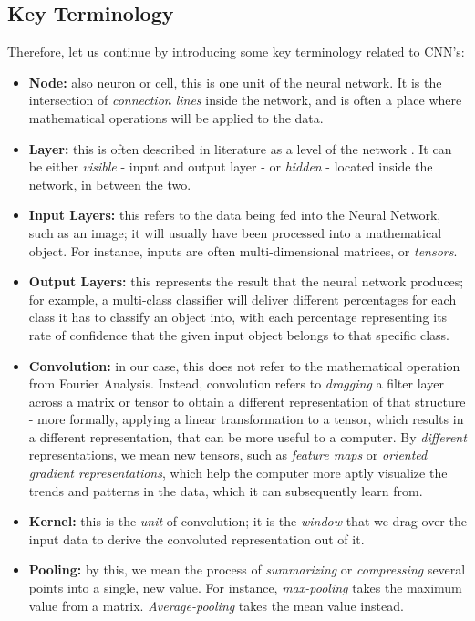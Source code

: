 \subsection{Key Terminology}
Therefore, let us continue by introducing some key terminology related to CNN's: 
\begin{itemize}
    \item \textbf{Node:} also neuron or cell, this is one unit of the neural network. It is the intersection of \textit{connection lines} inside the network, and is often a place where mathematical operations will be applied to the data.
    \item \textbf{Layer:} this is often described in literature as a level of the network \cite{Goodfellow-et-al-2016}. It can be either \textit{visible} - input and output layer - or \textit{hidden} - located inside the network, in between the two.
    \item \textbf{Input Layers:} this refers to the data being fed into the Neural Network, such as an image; it will usually have been processed into a mathematical object. For instance, inputs are often multi-dimensional matrices, or \textit{tensors}. 
    \item \textbf{Output Layers:} this represents the result that the neural network produces; for example, a multi-class classifier will deliver different percentages for each class it has to classify an object into, with each percentage representing its rate of confidence that the given input object belongs to that specific class.
    \item \textbf{Convolution:} in our case, this does not refer to the mathematical operation from Fourier Analysis. Instead, convolution refers to \textit{dragging} a filter layer across a matrix or tensor to obtain a different representation of that structure - more formally, applying a linear transformation to a tensor, which results in a different representation, that can be more useful to a computer. By \textit{different} representations, we mean new tensors, such as \textit{feature maps} or \textit{oriented gradient representations}, which help the computer more aptly visualize the trends and patterns in the data, which it can subsequently learn from. 
    \item \textbf{Kernel:} this is the \textit{unit} of convolution; it is the \textit{window} that we drag over the input data to derive the convoluted representation out of it.
    \item \textbf{Pooling:} by this, we mean the process of \textit{summarizing} or \textit{compressing} several points into a single, new value. For instance, \textit{max-pooling} takes the maximum value from a matrix. \textit{Average-pooling} takes the mean value instead.

\end{itemize}
